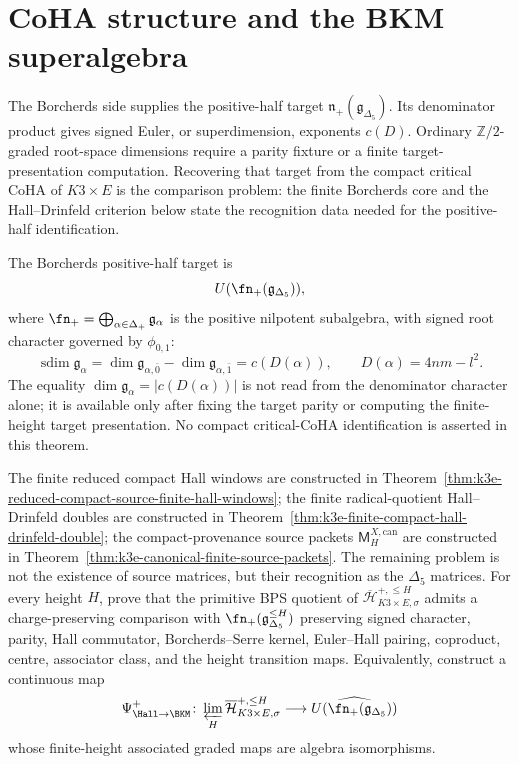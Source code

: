 \section{CoHA structure and the BKM superalgebra}
\label{sec:k3e-coha-structure}

The Borcherds side supplies the positive-half target
$\mathfrak n_+(\mathfrak{g}_{\Delta_5})$. Its denominator product gives
signed Euler, or superdimension, exponents \(c(D)\). Ordinary
\(\mathbb Z/2\)-graded root-space dimensions require a parity fixture or
a finite target-presentation computation. Recovering that target from
the compact critical CoHA of \(K3 \times E\) is the comparison problem:
the finite Borcherds core and the Hall--Drinfeld criterion below state
the recognition data needed for the positive-half identification.

\begin{theorem}
\label{thm:k3e-coha}
The Borcherds positive-half target is
\[
 U(\fn_+(\mathfrak{g}_{\Delta_5})),
\]
where $\fn_+ = \bigoplus_{\alpha \in \Delta_+} \mathfrak{g}_\alpha$ is
the positive nilpotent subalgebra, with signed root character governed
by $\phi_{0,1}$:
\[
\operatorname{sdim}\mathfrak g_\alpha
 =
\dim\mathfrak g_{\alpha,\bar0}-\dim\mathfrak g_{\alpha,\bar1}
 =
c(D(\alpha)),\qquad D(\alpha)=4nm-l^2.
\]
The equality \(\dim\mathfrak g_\alpha=|c(D(\alpha))|\) is not read from
the denominator character alone; it is available only after fixing the
target parity or computing the finite-height target presentation. No
compact critical-CoHA identification is asserted in this theorem.
\end{theorem}

\begin{problem}
\label{op:k3e-compact-coha-hall-borcherds}
The finite reduced compact Hall windows are constructed in
Theorem~\ref{thm:k3e-reduced-compact-source-finite-hall-windows}; the
finite radical-quotient Hall--Drinfeld doubles are constructed in
Theorem~\ref{thm:k3e-finite-compact-hall-drinfeld-double}; the
compact-provenance source packets
\(\mathsf M_H^{X,\mathrm{can}}\) are constructed in
Theorem~\ref{thm:k3e-canonical-finite-source-packets}. The remaining
problem is not the existence of source matrices, but their recognition
as the \(\Delta_5\) matrices. For every height \(H\), prove that the
primitive BPS quotient of
\(\overline{\mathcal H}^{+,\leq H}_{K3\times E,\sigma}\) admits a
charge-preserving comparison with
\(\fn_+(\mathfrak g_{\Delta_5}^{\leq H})\) preserving signed
character, parity, Hall commutator, Borcherds--Serre kernel,
Euler--Hall pairing, coproduct, centre, associator class, and the
height transition maps. Equivalently, construct a continuous map
\[
 \Psi^+_{\Hall\to\BKM}\colon
 \varprojlim_H\overline{\mathcal H}^{+,\leq H}_{K3\times E,\sigma}
 \longrightarrow
 \widehat{U(\fn_+(\mathfrak g_{\Delta_5}))}
\]
whose finite-height associated graded maps are algebra isomorphisms.
\end{problem}

